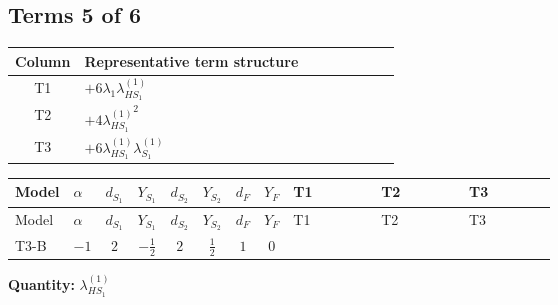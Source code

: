 \documentclass[8pt]{article}
\begin{document}
\begin{landscape}
\subsection*{Terms 5 of 6}
\begin{center}
\begin{tabular}{@{}c >{\raggedright\arraybackslash}p{0.82\linewidth}@{}}
\toprule
Column & Representative term structure \\
\midrule
T1 & \(\displaystyle +6 {\lambda_1} {\lambda_{HS_1}^{(1)}}\) \\
\midrule
T2 & \(\displaystyle +4 {\lambda_{HS_1}^{(1)}}^2\) \\
\midrule
T3 & \(\displaystyle +6 {\lambda_{HS_1}^{(1)}} {\lambda_{S_1}^{(1)}}\) \\
\midrule
\bottomrule
\end{tabular}
\end{center}
\smallskip
\tiny
\begin{longtable}{@{}llcccccc >{\raggedright\arraybackslash}p{0.21\linewidth} >{\raggedright\arraybackslash}p{0.21\linewidth} >{\raggedright\arraybackslash}p{0.21\linewidth}@{}}
\toprule
Model & $\alpha$ & $d_{S_1}$ & $Y_{S_1}$ & $d_{S_2}$ & $Y_{S_2}$ & $d_F$ & $Y_F$ & T1 & T2 & T3 \\
\midrule
\endfirsthead
\toprule
Model & $\alpha$ & $d_{S_1}$ & $Y_{S_1}$ & $d_{S_2}$ & $Y_{S_2}$ & $d_F$ & $Y_F$ & T1 & T2 & T3 \\
\midrule
\endhead
T3-B & $-1$ & $2$ & $-\frac{1}{2}$ & $2$ & $\frac{1}{2}$ & $1$ & $0$ & \scriptsize\adjustbox{max width=\linewidth}{$\begin{gathered} +6 {\lambda_1} {\lambda_{HS_1}^{(1)}}\end{gathered}$} & \scriptsize\adjustbox{max width=\linewidth}{$\begin{gathered} +4 {\lambda_{HS_1}^{(1)}}^2\end{gathered}$} & \scriptsize\adjustbox{max width=\linewidth}{$\begin{gathered} +6 {\lambda_{HS_1}^{(1)}} {\lambda_{S_1}^{(1)}}\end{gathered}$} \\
\midrule
\bottomrule
\end{longtable}
\clearpage
\noindent\textbf{Quantity: }$\lambda_{HS_1}^{(1)}$\par\smallskip

\end{landscape}
\end{document}
